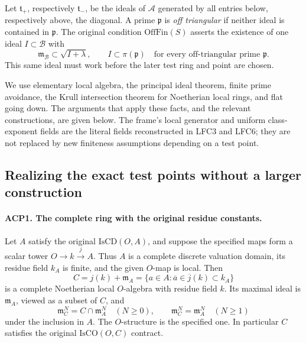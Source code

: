Let \(\mathfrak t_+\), respectively \(\mathfrak t_-\), be the
ideals of \(\mathcal A\) generated by all entries below,
respectively above, the diagonal.  A prime \(\mathfrak p\) is
\emph{off triangular} if neither ideal is contained in
\(\mathfrak p\).  The original condition \(\mathrm{OffFin}(S)\)
asserts the existence of one ideal \(I\subset\mathcal B\) with
\[
 \mathfrak m_{\mathcal B}\subset\sqrt{I+\lambda},
 \qquad I\subset\pi(\mathfrak p)
 \quad\text{for every off-triangular prime }\mathfrak p.
                                                        \tag{ACP.6}
\]
This same ideal must work before the later test ring and point are
chosen.

We use elementary local algebra, the principal ideal theorem,
finite prime avoidance, the Krull intersection theorem for
Noetherian local rings, and flat going down.  The arguments that
apply these facts, and the relevant constructions, are given below.
The frame's local generator and uniform class-exponent fields are
the literal fields reconstructed in LFC3 and LFC6; they are not
replaced by new finiteness assumptions depending on a test point.

\subsection{Realizing the exact test points without a larger construction}

\paragraph{ACP1. The complete ring with the original residue constants.}
\label{claim:ACP1}
Let \(A\) satisfy the original \(\mathrm{IsCD}(O,A)\), and
suppose the specified maps form a scalar tower
\(O\to k\overset{j}{\longrightarrow}A\).
Thus \(A\) is a complete discrete valuation domain, its residue
field \(k_A\) is finite, and the given \(O\)-map is local.
Then
\[
 C=j(k)+\mathfrak m_A
   =\{a\in A:\overline a\in\overline j(k)\subset k_A\}
                                                        \tag{ACP.7}
\]
is a complete Noetherian local \(O\)-algebra with residue field
\(k\).  Its maximal ideal is \(\mathfrak m_A\), viewed as a
subset of \(C\), and
\[
 \mathfrak m_C^N=C\cap\mathfrak m_A^N\quad(N\ge0),
 \qquad \mathfrak m_C^N=\mathfrak m_A^N\quad(N\ge1)
                                                        \tag{ACP.8}
\]
under the inclusion in \(A\).  The \(O\)-structure is the
specified one.  In particular \(C\) satisfies the original
\(\mathrm{IsCO}(O,C)\) contract.

